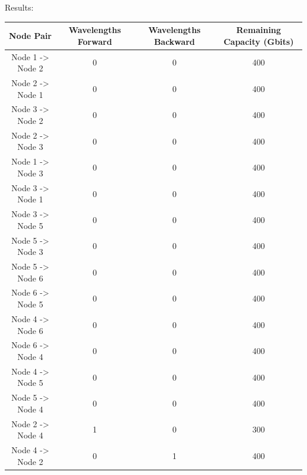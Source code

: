 \newpage
\vspace{13pt}
Results:

\begin{table}[h!]
	\centering
	\begin{tabular}{|| c | c | c | c ||}
		\hline
		Node Pair & Wavelengths Forward & Wavelengths Backward & Remaining Capacity (Gbits) \\
		\hline
		Node 1 -> Node 2 & 0 & 0 & 400 \\
		Node 2 -> Node 1 & 0 & 0 & 400 \\
		Node 3 -> Node 2 & 0 & 0 & 400 \\
		Node 2 -> Node 3 & 0 & 0 & 400 \\
		Node 1 -> Node 3 & 0 & 0 & 400 \\
		Node 3 -> Node 1 & 0 & 0 & 400 \\
		Node 3 -> Node 5 & 0 & 0 & 400 \\
		Node 5 -> Node 3 & 0 & 0 & 400 \\
		Node 5 -> Node 6 & 0 & 0 & 400 \\
		Node 6 -> Node 5 & 0 & 0 & 400 \\
		Node 4 -> Node 6 & 0 & 0 & 400 \\
		Node 6 -> Node 4 & 0 & 0 & 400 \\
		Node 4 -> Node 5 & 0 & 0 & 400 \\
		Node 5 -> Node 4 & 0 & 0 & 400 \\
		Node 2 -> Node 4 & 1 & 0 & 300 \\
		Node 4 -> Node 2 & 0 & 1 & 400 \\
		\hline
	\end{tabular}
\end{table}

